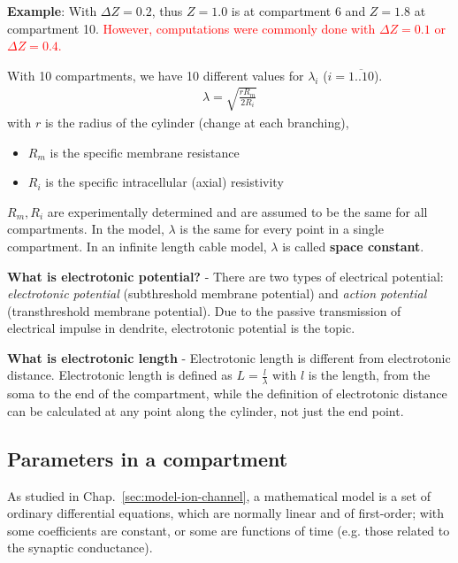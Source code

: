 {\bf Example}: With $\Delta Z=0.2$, thus $Z=1.0$ is at compartment 6
and $Z=1.8$ at compartment 10.
\textcolor{red}{However, computations were commonly done with $\Delta
  Z =0.1$ or $\Delta Z = 0.4$.}

With 10 compartments, we have 10 different values for $\lambda_i$
($i=\overline{1..10}$).
\begin{eqnarray}
  \label{eq:405}
  \lambda = \sqrt{\frac{rR_m}{2R_i}}
\end{eqnarray}
with $r$ is the radius of the cylinder (change at each branching),
\begin{itemize}
\item $R_m$ is the specific membrane resistance
\item $R_i$ is the specific intracellular (axial) resistivity
\end{itemize} 
$R_m,R_i$ are experimentally determined and are assumed
to be the same for all compartments.  In the model, $\lambda$ is the
same for every point in a single compartment.  In an infinite length
cable model, $\lambda$ is called {\bf space constant}.

{\bf What is electrotonic potential?} - There are two types of
electrical potential: {\it electrotonic potential} (subthreshold
membrane potential) and {\it action potential} (transthreshold
membrane potential). Due to the passive transmission of electrical
impulse in dendrite, electrotonic potential is the topic.


{\bf What is electrotonic length} - Electrotonic length is different
from electrotonic distance. Electrotonic length is defined as
$L=\frac{l}{\lambda}$ with $l$ is the length, from the soma to the end
of the compartment, while the definition of electrotonic distance can
be calculated at any point along the cylinder, not just the end point.


\subsection{Parameters in a compartment}
\label{sec:param-comp}

As studied in Chap.~\ref{sec:model-ion-channel}, a mathematical model is
a set of ordinary differential equations, which are normally linear
and of first-order; with some coefficients are constant, or some are
functions of time (e.g. those related to the synaptic conductance).

